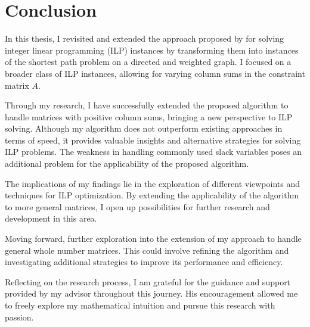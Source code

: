 \chapter{Conclusion}
In this thesis, I revisited and extended the approach proposed by \cite{algebraic_statistics} for solving integer linear programming (ILP) instances by transforming them into instances of the shortest path problem on a directed and weighted graph. I focused on a broader class of ILP instances, allowing for varying column sums in the constraint matrix $A$.

Through my research, I have successfully extended the proposed algorithm to handle matrices with positive column sums, bringing a new perspective to ILP solving. Although my algorithm does not outperform existing approaches in terms of speed, it provides valuable insights and alternative strategies for solving ILP problems. The weakness in handling commonly used slack variables poses an additional problem for the applicability of the proposed algorithm.

The implications of my findings lie in the exploration of different viewpoints and techniques for ILP optimization. By extending the applicability of the algorithm to more general matrices, I open up possibilities for further research and development in this area.

Moving forward, further exploration into the extension of my approach to handle general whole number matrices. This could involve refining the algorithm and investigating additional strategies to improve its performance and efficiency.

Reflecting on the research process, I am grateful for the guidance and support provided by my advisor throughout this journey. His encouragement allowed me to freely explore my mathematical intuition and pursue this research with passion.

